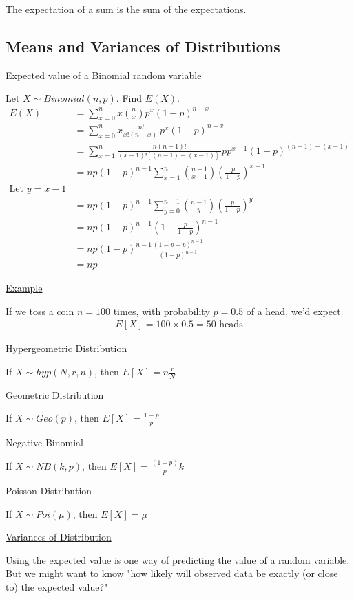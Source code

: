 \documentclass{article}
\begin{document}
The expectation of a sum is the sum of the expectations.

\subsection{Means and Variances of Distributions}

\underline{Expected value of a Binomial random variable}

Let $X \sim Binomial(n,p)$. Find $E(X)$.
\begin{align*}
    E(X) &= \sum_{x=0}^n x \binom{n}{x}p^x(1-p)^{n-x}\\
    &= \sum_{x=0}^n x \frac{n!}{x!(n-x)!}p^x(1-p)^{n-x}\\
    &= \sum_{x=1}^n \frac{n(n-1)!}{(x-1)![(n-1)-(x-1)]!}pp^{x-1}(1-p)^{(n-1)-(x-1)}\\
    &= np(1-p)^{n-1}\sum_{x=1}^n \binom{n-1}{x-1}\left(\frac{p}{1-p}\right)^{x-1}\\
    \text{Let } y = x -1\\
    &= np(1-p)^{n-1}\sum_{y=0}^{n-1}\binom{n-1}{y}\left(\frac{p}{1-p}\right)^y \\
    &= np(1-p)^{n-1}\left(1 + \frac{p}{1-p}\right)^{n-1} \\
    &= np(1-p)^{n-1}\frac{(1-p+p)^{n-1}}{(1-p)^{n-1}} \\
    &= np
\end{align*}

\underline{Example}

If we toss a coin $n = 100$ times, with probability $p = 0.5$ of a head, we'd expect
\begin{align*}
    E[X] = 100 \times 0.5 = 50 \text{ heads}
\end{align*}


Hypergeometric Distribution

If $X \sim hyp(N,r,n)$, then $E[X] = n\frac{r}{N}$

Geometric Distribution

If $X \sim Geo(p)$, then $E[X] = \frac{1-p}{p}$

Negative Binomial

If $X \sim NB(k,p)$, then $E[X] = \frac{(1-p)}{p}k$

Poisson Distribution

If $X \sim Poi(\mu)$, then $E[X] = \mu$


\underline{Variances of Distribution}

Using the expected value is one way of predicting the value of a random variable. But we might want to know "how likely will observed data be exactly (or close to) the expected value?"
\end{document}
